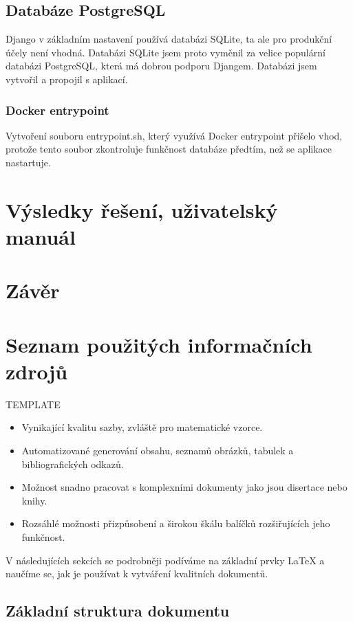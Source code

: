\documentclass[12pt, a4paper,
twoside,        %
openright
]{report}
\begin{document}
\section{Databáze PostgreSQL}
\label{sec:databazepostgresql}
Django v základním nastavení používá databázi SQLite, ta ale pro produkční účely není vhodná. Databázi SQLite jsem proto vyměnil za velice populární databázi PostgreSQL, která má dobrou podporu Djangem. Databázi jsem vytvořil a propojil s aplikací.
\subsection{Docker entrypoint}
Vytvoření souboru entrypoint.sh, který využívá Docker entrypoint přišelo vhod, protože tento soubor zkontroluje funkčnost databáze předtím, než se aplikace nastartuje.

\chapter{Výsledky řešení, uživatelský manuál}

\chapter{Závěr}

\chapter{Seznam použitých informačních zdrojů}
TEMPLATE
\begin{itemize}
	\item Vynikající kvalitu sazby, zvláště pro matematické vzorce.
	\item Automatizované generování obsahu, seznamů obrázků, tabulek a bibliografických odkazů.
	\item Možnost snadno pracovat s komplexními dokumenty jako jsou disertace nebo knihy.
	\item Rozsáhlé možnosti přizpůsobení a širokou škálu balíčků rozšiřujících jeho funkčnost.
\end{itemize}

V následujících sekcích se podrobněji podíváme na základní prvky \LaTeX{} a naučíme se, jak je používat k vytváření kvalitních dokumentů.


\section{Základní struktura dokumentu}
\label{sec:zakladni_struktura}
\end{document}
